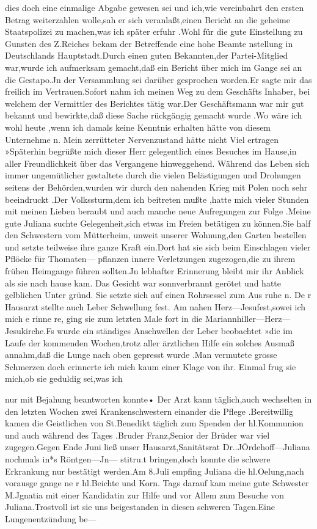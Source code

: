 \documentclass[a4paper,11pt]{article}
\begin{document}
dies doch eine einmalige Abgabe gewesen sei und ich,wie vereinbahrt den ersten Betrag weiterzahlen wolle,sah er sich veranlaßt,einen Bericht an die geheime Staatspolizei zu machen,was ich später erfuhr .Wohl für die gute Einstellung zu Gunsten des Z.Reiches bekam der Betreffende eine hohe Beamte nstellung in Deutschlands Hauptstadt.Durch einen guten Bekannten,der Partei-Mitglied war,wurde ich aufmerksam gemacht,daß ein Bericht über mich im Gange sei an die Gestapo.Jn der Versammlung sei darüber gesprochen worden.Er sagte mir das freilich im Vertrauen.Sofort nahm ich meinen Weg zu dem Geschäfts Inhaber, bei welchem der Vermittler des Berichtes tätig war.Der Geschäftsmann war mir gut bekannt und bewirkte,daß diese Sache rückgängig gemacht wurde .Wo wäre ich wohl heute ,wenn ich damals keine Kenntnis erhalten hätte von diesem Unternehme n. Mein zerrütteter Nervenzustand hätte nicht Viel ertragen »Späterhin begrüßte mich dieser Herr gelegentlich eines Besuches im Hause,in aller Freundlichkeit über das Vergangene hinweggehend. Während das Leben sich immer ungemütlicher gestaltete durch die vielen Belästigungen und Drohungen seitens der Behörden,wurden wir durch den nahenden Krieg mit Polen noch sehr beeindruckt .Der Volkssturm,dem ich beitreten mußte ,hatte mich vieler Stunden mit meinen Lieben beraubt und auch manche neue Aufregungen zur Folge .Meine gute Juliana suchte Gelegenheit,sich etwas im Freien betätigen zu können.Sie half den Schwestern vom Mütterheim, unweit unserer Wohnung,den Garten bestellen und setzte teilweise ihre ganze Kraft ein.Dort hat sie sich beim Einschlagen vieler Pflöcke für Thomaten— pflanzen innere Verletzungen zugezogen,die zu ihrem frühen Heimgange führen sollten.Jn lebhafter Erinnerung bleibt mir ihr Anblick als sie nach hause kam. Das Gesicht war sonnverbrannt gerötet und hatte gelblichen Unter gründ. Sie setzte sich auf einen Rohrsessel zum Aus ruhe n. De r Hausarzt stellte auch Leber Schwellung fest. Am nahen Herz—Jesufest,sowei ich mich e rinne re, ging sie zum letzten Male fort in die Mariannhiller—Herz—Jesukirche.Fs wurde ein ständiges Anschwellen der Leber beobachtet »die im Laufe der kommenden Wochen,trotz aller ärztlichen Hilfe ein solches Ausmaß annahm,daß die Lunge nach oben gepresst wurde .Man vermutete grosse Schmerzen doch erinnerte ich mich kaum einer Klage von ihr. Einmal frug sie mich,ob sie geduldig sei,was ich

  nur mit Bejahung beantworten konnte• Der Arzt kann täglich,auch wechselten in den letzten Wochen zwei Krankenschwestern einander die Pflege .Bereitwillig kamen die Geistlichen von St.Benedikt täglich zum Spenden der hl.Kommunion und auch während des Tages .Bruder Franz,Senior der Brüder war viel zugegen.Gegen Ende Juni ließ unser Hausarzt,Sanitätsrat Dr..JÖrdehoff—Juliana nochmals in*s Röntgen—Jn— stitru.t bringen,doch konnte die schwere Erkrankung nur bestätigt werden.Am 8.Juli empfing Juliana die hl.Oelung,nach vorausge gange ne r hl.Beichte und Korn. Tags darauf kam meine gute Schwester M.Jgnatia mit einer Kandidatin zur Hilfe und vor Allem zum Besuche von Juliana.Trostvoll ist sie uns beigestanden in diesen schweren Tagen.Eine Lungenentzündung be—
\end{document}
